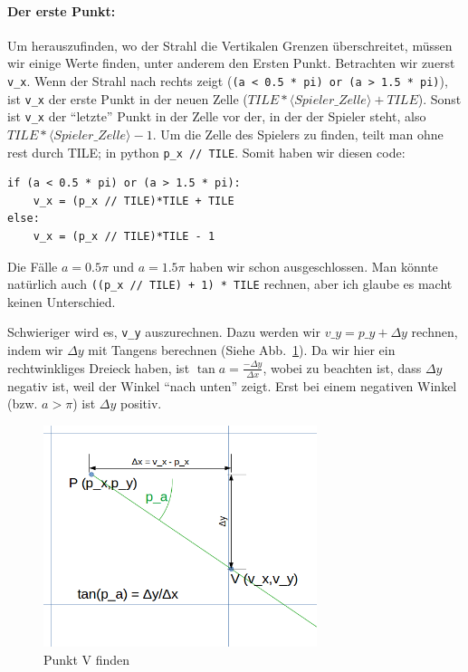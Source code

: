 \documentclass[a4paper,12pt]{report}
\begin{document}
\paragraph{Der erste Punkt:}
Um herauszufinden, wo der Strahl die Vertikalen Grenzen überschreitet, müssen wir einige Werte finden, unter anderem den Ersten Punkt. Betrachten wir zuerst \texttt{v\_x}. Wenn der Strahl nach rechts zeigt (\texttt{(a < 0.5 * pi) or (a > 1.5 * pi)}), ist \texttt{v\_x} der erste Punkt in der neuen Zelle ($TILE*\langle Spieler\_Zelle\rangle + TILE$). Sonst ist \texttt{v\_x} der ``letzte'' Punkt in der Zelle vor der, in der der Spieler steht, also $TILE*\langle Spieler\_Zelle\rangle - 1$. Um die Zelle des Spielers zu finden, teilt man ohne rest durch TILE; in python \texttt{p\_x // TILE}. Somit haben wir diesen code:
\begin{Verbatim}[baselinestretch=1.0, xleftmargin=1cm]
if (a < 0.5 * pi) or (a > 1.5 * pi):
	v_x = (p_x // TILE)*TILE + TILE
else:
	v_x = (p_x // TILE)*TILE - 1
\end{Verbatim}

Die Fälle $a = 0.5\pi$ und $a = 1.5\pi$ haben wir schon ausgeschlossen. Man könnte natürlich auch \texttt{((p\_x // TILE) + 1) * TILE} rechnen, aber ich glaube es macht keinen Unterschied.

Schwieriger wird es, \texttt{v\_y} auszurechnen. Dazu werden wir $v\_y = p\_y + \Delta y$ rechnen, indem wir $\Delta y$ mit Tangens berechnen (Siehe Abb.~\ref{fig:vcheck1}). Da wir hier ein rechtwinkliges Dreieck haben, ist $\tan a = \frac{-\Delta y}{\Delta x}$, wobei zu beachten ist, dass $\Delta y$ negativ ist, weil der Winkel ``nach unten'' zeigt.
Erst bei einem negativen Winkel (bzw. $a > \pi$) ist $\Delta y$ positiv.

\begin{figure}[htbp] 
        \centering
        \includegraphics[width=8cm]{vcheck1.png} 
        \caption{Punkt V finden}
        \label{fig:vcheck1}
\end{figure}
\end{document}
